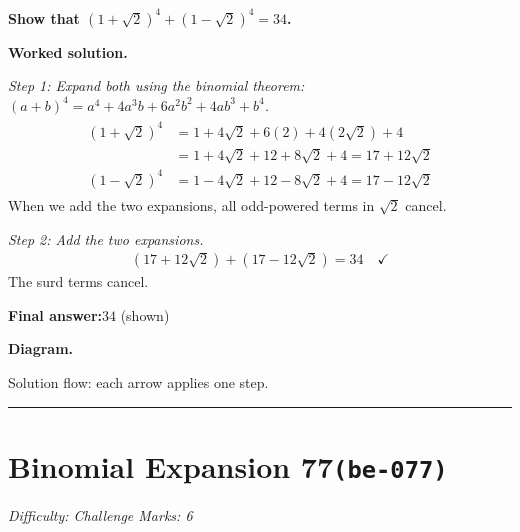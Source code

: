 \documentclass[11pt]{article}
\newcommand{\question}[1]{\par\medskip\noindent\textbf{#1}\par}
\begin{document}
\question{Show that \( (1 + \sqrt{2})^4 + (1 - \sqrt{2})^4 = 34 \).}

\textbf{Worked solution.}

\textit{Step 1: Expand both using the binomial theorem: \((a+b)^4 = a^4 + 4a^3b + 6a^2b^2 + 4ab^3 + b^4\).}
\[\begin{gathered}
\begin{aligned} (1+\sqrt{2})^4 &= 1 + 4\sqrt{2} + 6(2) + 4(2\sqrt{2}) + 4 \\ &= 1 + 4\sqrt{2} + 12 + 8\sqrt{2} + 4 = 17 + 12\sqrt{2} \\ (1-\sqrt{2})^4 &= 1 - 4\sqrt{2} + 12 - 8\sqrt{2} + 4 = 17 - 12\sqrt{2} \end{aligned}
\end{gathered}\]
When we add the two expansions, all odd-powered terms in \(\sqrt{2}\) cancel.

\textit{Step 2: Add the two expansions.}
\[\begin{gathered}
(17 + 12\sqrt{2}) + (17 - 12\sqrt{2}) = 34 \quad \checkmark
\end{gathered}\]
The surd terms cancel.

\begin{answerbox}
\textbf{Final answer:}\quad \(\displaystyle 34\) (shown)
\end{answerbox}
\textbf{Diagram.}

\begin{center}
\end{center}
\small Solution flow: each arrow applies one step.\normalsize

\medskip\hrule

\section*{Binomial Expansion 77\quad\small\texttt{(be-077)}}
\textit{Difficulty: Challenge \quad\textbar\quad Marks: 6}
\end{document}
